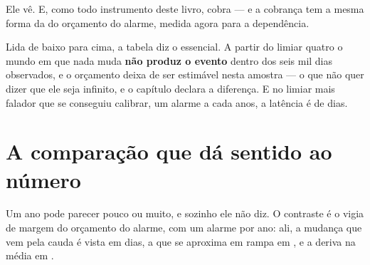 Ele vê. E, como todo instrumento deste livro, cobra --- e a cobrança tem a mesma forma da do
orçamento do alarme, medida agora para a dependência.

\begin{table}[htbp]
  \centering
  \footnotesize
  \caption{O orçamento e a latência do instrumento conjunto, com a mudança acontecendo no meio da
    série. O orçamento é medido no mundo em que o par não muda, e a latência no mundo em que ele
    muda.}
  \label{tab:vizinhanca}
\end{table}

Lida de baixo para cima, a tabela diz o essencial. A partir do limiar quatro o mundo em que nada
muda \textbf{não produz o evento} dentro dos seis mil dias observados, e o orçamento deixa de ser
estimável nesta amostra --- o que não quer dizer que ele seja infinito, e o capítulo declara a
diferença. E no limiar mais falador que se conseguiu calibrar, um alarme a cada
\numVizinhancaLimiarDoisAnos{} anos, a latência é de \numVizinhancaLimiarDoisLatencia{} dias.

\section{A comparação que dá sentido ao número}

Um ano pode parecer pouco ou muito, e sozinho ele não diz. O contraste é o vigia de margem do
orçamento do alarme, com um alarme por ano: ali, a mudança que vem pela cauda é vista em
\numFormaDegrauDias{} dias, a que se aproxima em rampa em \numFormaRampaDias, e a deriva na média
em \numFormaDerivaDias.

